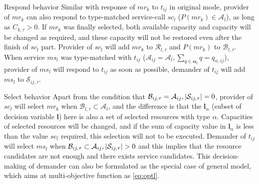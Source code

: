 \begin{asparaenum}
\item Respond behavior
Similar with response of $mr_k$ to $t_{ij}$ in original mode, provider of $mr_k$ can also respond to type-matched service-call $sc_l$ ($P(mr_k)\in\mathcal{A}_l$), as long as $C_{k,\tau}> 0$. If $mr_k$ was finally selected, both available capacity and capacity will be changed as required, and these capacity will not be restored even after the finish of $sc_l$ part. Provider of $sc_l$ will add $mr_k$ to $\mathcal{R}_{l,\tau}$ and $P(mr_k)$ to $\mathcal{B}_{l,\tau}$. When service $ms_l$ was type-matched with $t_{ij}$ ($\mathcal{A}_{ij} =\mathcal{A}_l,\sum_{q\in\bm{\alpha}_l} q = q_{\alpha,ij}$), provider of $ms_l$ will respond to $t_{ij}$ as soon as possible, demander of $t_{ij}$ will add $ms_l$ to $\mathcal{S}_{ij,\tau}$.



\item Select behavior
Apart from the condition that $\mathcal{B}_{ij,\tau} = \mathcal{A}_{ij},\left|\mathcal{S}_{ij,\tau}\right|=0$, provider of $sc_l$ will select $mr_k$ when $\mathcal{B}_{l,\tau}\subset\mathcal{A}_l$, and the difference is that the $\bm{l}_{\alpha}$ (subset of decision variable $\bm{l}$) here is also a set of selected resources with type $\alpha$. Capacities of selected resources will be changed, and if the sum of capacity value in $\bm{l}_{\alpha}$ is less than the value $sc_l$ required, this selection will not to be executed.
Demander of $t_{ij}$ will select $ms_l$ when $\mathcal{B}_{ij,\tau}\subset\mathcal{A}_{ij},\abs{\mathcal{S}_{ij,\tau}}>0$ and this implies that the resource candidates are not enough and there exists service candidates.
This decision-making of demander can also be formulated as the special case of general model, which aims at multi-objective function as \autoref{eq:optl}.


\end{asparaenum}
